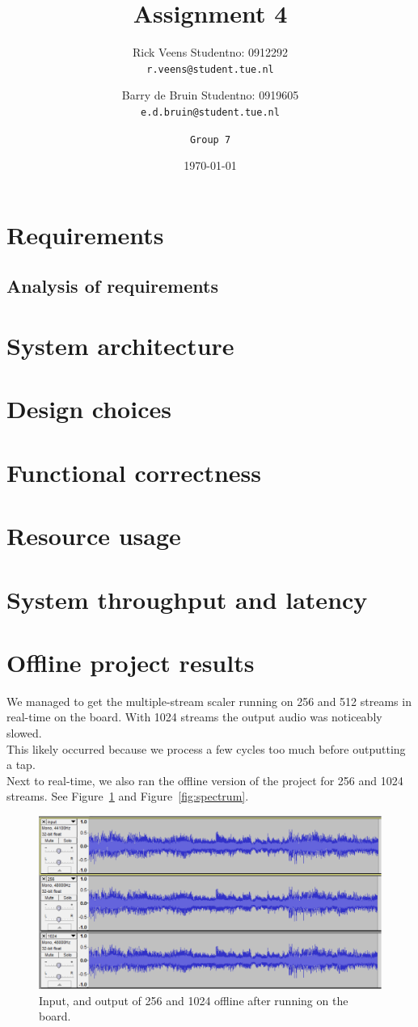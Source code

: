 \documentclass[a4paper,twoside,11pt, fleqn]{article}
\title{\vspace{-\baselineskip}\sffamily\bfseries Assignment 4}
\author{
	Rick Veens \qquad Studentno: 0912292\\
	\texttt{r.veens@student.tue.nl}
	\and
	Barry de Bruin \qquad Studentno: 0919605\\
	\texttt{e.d.bruin@student.tue.nl}
	\and
	\texttt{Group 7}
}
\date{\today}
\begin{document}
\maketitle
\newpage

\tableofcontents

\newpage

\section{Requirements}
\subsection{Analysis of requirements}
\section{System architecture}
\section{Design choices}
\section{Functional correctness}
\section{Resource usage}
\section{System throughput and latency}
\section{Offline project results}
We managed to get the multiple-stream scaler running on 256 and 512 streams in real-time on the board. With 1024 streams the output audio was noticeably slowed. \\ This likely occurred because we process a few cycles too much before outputting a tap. \\

Next to real-time, we also ran the offline version of the project for 256 and 1024 streams. See Figure~\ref{fig:output} and Figure~\ref{fig:spectrum}.
\begin{figure}[h]
	\centering
	\includegraphics[scale = 0.6]{Images/output_offline.png}
    \caption{Input, and output of 256 and 1024 offline after running on the board.}
    \label{fig:output}
\end{figure}
\end{document}
